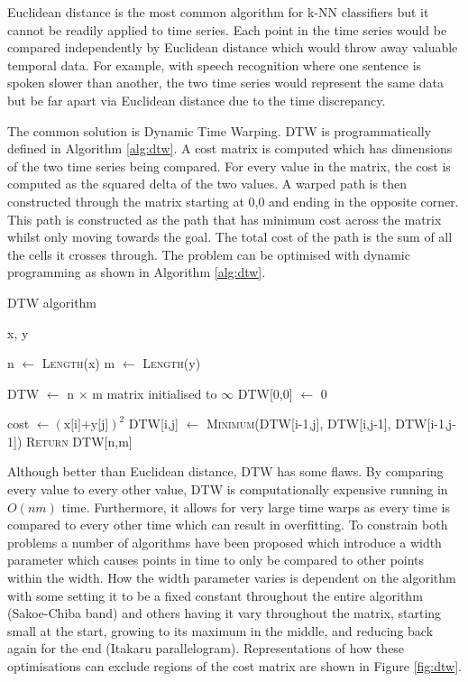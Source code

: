Euclidean distance is the most common algorithm for k-NN classifiers\cite{faouzi2024time} but it cannot be readily applied to time series. Each point in the time series would be compared independently by Euclidean distance which would throw away valuable temporal data. For example, with speech recognition where one sentence is spoken slower than another, the two time series would represent the same data but be far apart via Euclidean distance due to the time discrepancy.


The common solution is Dynamic Time Warping\cite{sakoe1978dynamic}. DTW is programmatically defined in Algorithm \ref{alg:dtw}. A cost matrix is computed which has dimensions of the two time series being compared. For every value in the matrix, the cost is computed as the squared delta of the two values. A warped path is then constructed through the matrix starting at 0,0 and ending in the opposite corner. This path is constructed as the path that has minimum cost across the matrix whilst only moving towards the goal. The total cost of the path is the sum of all the cells it crosses through. The problem can be optimised with dynamic programming as shown in Algorithm \ref{alg:dtw}.

\begin{algorithm}[h]
    \caption{DTW algorithm}
    \label{alg:dtw}
    \begin{algorithmic}
        \Require x, y 

        \State n $\gets$ \textsc{Length}(x)
        \State m $\gets$ \textsc{Length}(y)

        \State DTW $\gets$ n $\times$ m matrix initialised to $\infty$
        \State DTW[0,0] $\gets$ 0

                \State cost $\gets (\text{x[i]+y[j]})^2$
                \State DTW[i,j] $\gets$ \textsc{Minimum}(DTW[i-1,j], DTW[i,j-1], DTW[i-1,j-1])
            \EndFor
        \EndFor
        \State \textsc{Return} DTW[n,m]
    \end{algorithmic}
\end{algorithm}

Although better than Euclidean distance, DTW has some flaws. By comparing every value to every other value, DTW is computationally expensive running in $O(nm)$ time. Furthermore, it allows for very large time warps as every time is compared to every other time which can result in overfitting. To constrain both problems a number of algorithms have been proposed which introduce a width parameter which causes points in time to only be compared to other points within the width. How the width parameter varies is dependent on the algorithm with some setting it to be a fixed constant throughout the entire algorithm (Sakoe-Chiba band\cite{sakoe1978dynamic}) and others having it vary throughout the matrix, starting small at the start, growing to its maximum in the middle, and reducing back again for the end (Itakaru parallelogram\cite{itakura2003minimum}). Representations of how these optimisations can exclude regions of the cost matrix are shown in Figure \ref{fig:dtw}.

